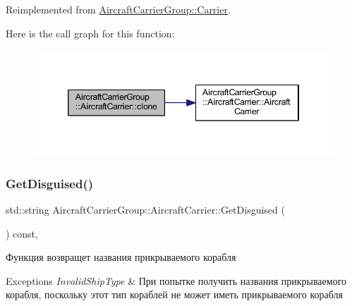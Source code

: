 Reimplemented from \mbox{\hyperlink{class_aircraft_carrier_group_1_1_carrier_acb567d5ef451d10187f46c34653626e1}{Aircraft\+Carrier\+Group\+::\+Carrier}}.

Here is the call graph for this function\+:
\nopagebreak
\begin{figure}[H]
\begin{center}
\leavevmode
\includegraphics[width=346pt]{class_aircraft_carrier_group_1_1_aircraft_carrier_ab2f921c586a31f9933874f437baf9c16_cgraph}
\end{center}
\end{figure}
\mbox{\label{class_aircraft_carrier_group_1_1_aircraft_carrier_ae6d7a76049249ef218e6859334ed2eaa}} 
\subsubsection{\texorpdfstring{Get\+Disguised()}{GetDisguised()}}
{\footnotesize\ttfamily std\+::string Aircraft\+Carrier\+Group\+::\+Aircraft\+Carrier\+::\+Get\+Disguised (\begin{DoxyParamCaption}{ }\end{DoxyParamCaption}) const\hspace{0.3cm}{\ttfamily [inline]}, {\ttfamily [virtual]}}



Функция возвращет названия прикрываемого корабля 


\begin{DoxyExceptions}{Exceptions}
{\em Invalid\+Ship\+Type} & При попытке получить названия прикрываемого корабля, поскольку этот тип кораблей не может иметь прикрываемого корабля \\
\hline
\end{DoxyExceptions}



